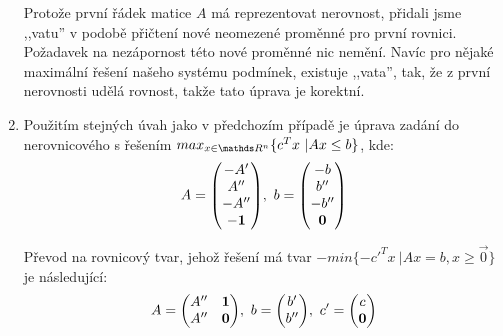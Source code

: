 \begin{reseni}
\begin{enumerate}
	Protože první řádek matice $A$ má reprezentovat nerovnost, přidali jsme
	,,vatu'' v podobě přičtení nové neomezené proměnné pro první rovnici.
	Požadavek na nezápornost této nové proměnné nic nemění. Navíc pro nějaké
	maximální řešení našeho systému podmínek, existuje ,,vata'', tak, že z
	první nerovnosti udělá rovnost, takže tato úprava je korektní.
\item
	Použitím stejných úvah jako v předchozím případě je úprava zadání do
	nerovnicového s řešením $max_{x \in \R^n} \{ c^Tx~| Ax \leq b\}$, kde:
	\begin{align*}
		A = \begin{pmatrix}  -A' \\ A'' \\ -A'' \\ -\mathbf 1 \end{pmatrix}\!,~
		b = \begin{pmatrix}  -b \\ b'' \\ -b'' \\ \mathbf 0 \end{pmatrix}
	\end{align*}

	Převod na rovnicový tvar, jehož řešení má tvar $-min \{ -c'^Tx~| Ax = b, x \geq \vec 0 \}$ je následující:
	\begin{align*}
		A = \begin{pmatrix} A'' & \mathbf 1 \\ A'' & \mathbf 0  \end{pmatrix}\!,~
		b = \begin{pmatrix} b' \\ b'' \end{pmatrix}\!,~
		c' = \begin{pmatrix} c \\ \mathbf 0 \end{pmatrix}
	\end{align*}

\end{enumerate}
\end{reseni}

